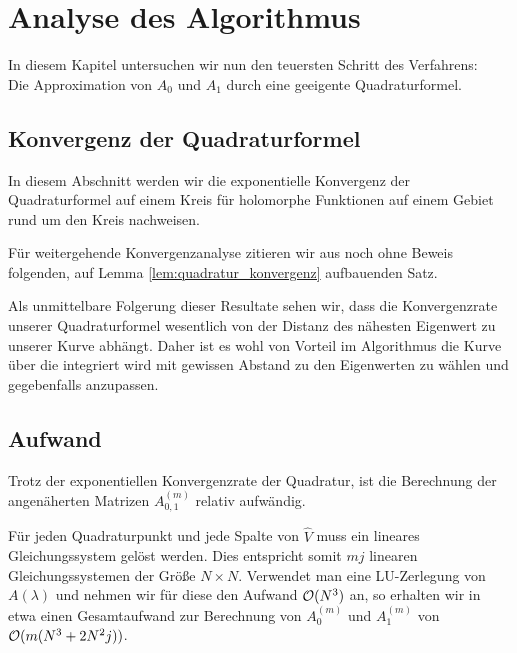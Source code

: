 \chapter{Analyse des Algorithmus}

In diesem Kapitel untersuchen wir nun den teuersten Schritt des Verfahrens: \\
Die Approximation von $A_0$ und $A_1$ durch eine geeigente Quadraturformel.


\section{Konvergenz der Quadraturformel}

In diesem Abschnitt werden wir die exponentielle Konvergenz der Quadraturformel
auf einem Kreis für holomorphe Funktionen auf einem Gebiet rund um den Kreis nachweisen.



Für weitergehende Konvergenzanalyse zitieren wir aus \cite{EWPs} noch ohne Beweis  folgenden, auf Lemma \ref{lem:quadratur_konvergenz} aufbauenden Satz.


Als unmittelbare Folgerung dieser Resultate sehen wir, dass die Konvergenzrate
unserer Quadraturformel wesentlich von der Distanz des nähesten Eigenwert zu
unserer Kurve abhängt. Daher ist es wohl von Vorteil im Algorithmus die Kurve
über die integriert wird mit gewissen Abstand zu den Eigenwerten zu wählen
und gegebenfalls anzupassen.

\section{Aufwand}

Trotz der exponentiellen Konvergenzrate der Quadratur, ist die Berechnung der angenäherten
Matrizen $A_{0, 1}^{(m)}$ relativ aufwändig.

Für jeden Quadraturpunkt und jede Spalte von $\hat V$ muss ein lineares Gleichungssystem gelöst werden.
Dies entspricht somit $m j$ linearen Gleichungssystemen der Größe $N \times N$.
Verwendet man eine LU-Zerlegung von $A(\lambda)$ und nehmen wir für diese den Aufwand $\mathcal{O}(N^3)$ an, so erhalten wir in etwa einen Gesamtaufwand zur Berechnung von $A_0^{(m)}$ und $A_1^{(m)}$ von $\mathcal{O}(m (N^3 + 2 N^2 j))$.
